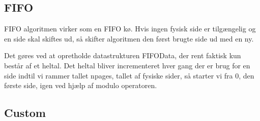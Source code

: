 \subsection{FIFO}
FIFO algoritmen virker som en FIFO kø. Hvis ingen fysisk side er tilgængelig og en side skal skiftes ud, så skifter algoritmen den først brugte side ud med en ny.

Det gøres ved at opretholde datastrukturen FIFOData, der rent faktisk kun består af et heltal. Det heltal bliver incrementeret hver gang der er brug for en side indtil vi rammer tallet npages, tallet af fysiske sider, så starter vi fra 0, den første side, igen ved hjælp af modulo operatoren.

\subsection{Custom}